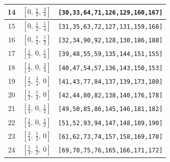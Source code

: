 \documentclass[fleqn,8pt]{jsarticle}
\begin{document}
\begin{longtable}{ccc}
14 & $\left[ 0,\, \frac{1}{2},\, \frac{3}{4} \right]$ & {\tt [30,33,64,71,126,129,160,167]} \\ \hline
15 & $\left[ 0,\, \frac{1}{2},\, \frac{1}{4} \right]$ & {\tt [31,35,63,72,127,131,159,168]} \\ \hline
16 & $\left[ 0,\, \frac{1}{4},\, \frac{1}{2} \right]$ & {\tt [32,34,90,92,128,130,186,188]} \\ \hline
17 & $\left[ \frac{1}{2},\, 0,\, \frac{1}{4} \right]$ & {\tt [39,48,55,59,135,144,151,155]} \\ \hline
18 & $\left[ \frac{1}{2},\, 0,\, \frac{3}{4} \right]$ & {\tt [40,47,54,57,136,143,150,153]} \\ \hline
19 & $\left[ \frac{1}{2},\, \frac{3}{4},\, 0 \right]$ & {\tt [41,43,77,84,137,139,173,180]} \\ \hline
20 & $\left[ \frac{1}{2},\, \frac{1}{4},\, 0 \right]$ & {\tt [42,44,80,82,138,140,176,178]} \\ \hline
21 & $\left[ \frac{3}{4},\, 0,\, \frac{1}{2} \right]$ & {\tt [49,50,85,86,145,146,181,182]} \\ \hline
22 & $\left[ \frac{1}{4},\, 0,\, \frac{1}{2} \right]$ & {\tt [51,52,93,94,147,148,189,190]} \\ \hline
23 & $\left[ \frac{3}{4},\, \frac{1}{2},\, 0 \right]$ & {\tt [61,62,73,74,157,158,169,170]} \\ \hline
24 & $\left[ \frac{1}{4},\, \frac{1}{2},\, 0 \right]$ & {\tt [69,70,75,76,165,166,171,172]} \\
\end{longtable}
\renewcommand{\arraystretch}{1.2}
\end{document}
